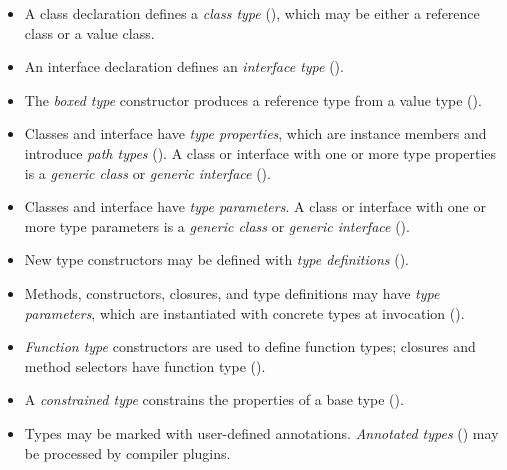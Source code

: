 \begin{itemize}
\item A class declaration defines a \emph{class type}
(), which
may be either a reference class or a value class.
\item An interface declaration defines an \emph{interface type}
().
\item The \emph{boxed type} constructor produces a reference
type from a value type ().
\iftypeparams\else
\item Classes and interface have \emph{type properties}, which
are instance members and introduce \emph{path types}
().
A class or interface with one or more type properties is a
\emph{generic class} or \emph{generic interface}
().
\fi
\iftypeparams
\item Classes and interface have \emph{type parameters}.
A class or interface with one or more type parameters is a
\emph{generic class} or \emph{generic interface}
().
\fi
\item New type constructors may be defined with \emph{type
definitions} ().
\item Methods, constructors, closures, and type definitions may
have \emph{type parameters}, which are instantiated with
concrete types at invocation ().
\item \emph{Function type} constructors are used to define
function types; closures and method selectors have function
type ().
\item A \emph{constrained type} constrains the properties of
a base type ().
\item Types may be marked with user-defined annotations.
\emph{Annotated types} ()
may be processed by compiler plugins.
\end{itemize}

